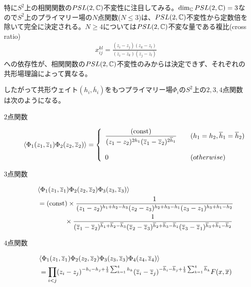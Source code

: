 \begin{ex}
特に$S^2$上の相関関数の$PSL(2,\mathbb{C})$不変性に注目してみる。$\dim_{\mathbb{C}} PSL(2,\mathbb{C})=3$なので$S^2$上のプライマリー場の$N$点関数($N\leq 3$)は、$PSL(2,\mathbb{C})$不変性から定数倍を除いて完全に決定される。$N\geq 4$については$PSL(2,\mathbb{C})$不変な量である複比(cross ratio)
\begin{align}
x_{ij}^{kl}=\frac{(z_i-z_j)(z_k-z_l)}{(z_i-z_k)(z_j-z_l)}
\end{align}
への依存性が、相関関数の$PSL(2,\mathbb{C})$不変性のみからは決定できず、それぞれの共形場理論によって異なる。

したがって共形ウェイト$(h_i,\overline{h}_i)$をもつプライマリー場$\Phi_i$の$S^2$上の$2,3,4$点関数は次のようになる。
\begin{oframed}
\begin{description}
	\item[$2$点関数] 
	\begin{align}
	\la \Phi_1(z_1,\overline{z}_1)\Phi_2(z_2,\overline{z}_2) \ra = \left\{
	\begin{array}{ll}
	\dfrac{(\text{const})}{(z_1-z_2)^{2h_1}(\overline{z}_1-\overline{z}_2)^{2\overline{h}_1}}\quad &(h_1=h_2,\overline{h}_1=\overline{h}_2)\bigskip\\
	0 &(otherwise)
	\end{array}
	\right.
	\end{align}
	
	\item[$3$点関数] 
	\begin{align}
	&\langle \Phi_1(z_1,\overline{z}_1)\Phi_2(z_2,\overline{z}_2)\Phi_3(z_3,\overline{z}_3) \rangle \notag\\
	&= (\text{const})\times \frac{1}{(z_1-z_2)^{h_1+h_2-h_3}(z_2-z_3)^{h_2+h_3-h_1}(z_3-z_1)^{h_3+h_1-h_2}}\notag\\
	&\qquad\qquad \times \frac{1}{(\overline{z}_1-\overline{z}_2)^{\overline{h}_1+\overline{h}_2-\overline{h}_3}(\overline{z}_2-\overline{z}_3)^{\overline{h}_2+\overline{h}_3-\overline{h}_1}(\overline{z}_3-\overline{z}_1)^{\overline{h}_3+\overline{h}_1-\overline{h}_2}}
	\end{align}
	
	\item[$4$点関数] 
	\begin{align}
	&\langle \Phi_1(z_1,\overline{z}_1)\Phi_2(z_2,\overline{z}_2)\Phi_3(z_3,\overline{z}_3)\Phi_4(z_4,\overline{z}_4) \rangle \notag\\
	&= \prod_{i<j}(z_i-z_j)^{-h_i-h_j+\frac{1}{3}\sum_{k=1}^{4}h_k}(\overline{z}_i-\overline{z}_j)^{-\overline{h}_i-\overline{h}_j+\frac{1}{3}\sum_{k=1}^{4}\overline{h}_k}F(x,\overline{x})
	\end{align}
\end{description}
\end{oframed}
\end{ex}

